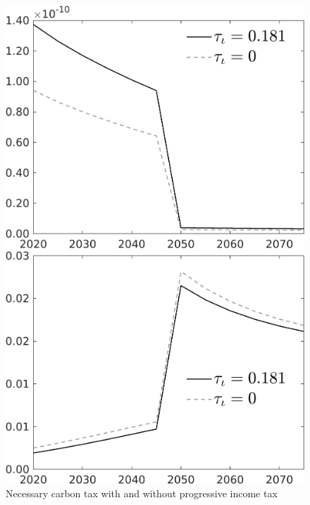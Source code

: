  \begin{figure}[h!!]
	\centering
	\caption{Necessary carbon tax with and without progressive income tax  }\label{fig:Limit_nsk0_xgr0_know_app}		
	\begin{minipage}[]{0.32\textwidth}
		\includegraphics[width=1\textwidth]{../../codding_model/own_basedOnFried/optimalPol_010922_revision/figures/all_13Sept22/CompTauf_bytaul_Reg0_sff_spillover0_nsk0_xgr0_knspil0_sep0_LFlimit1_emsbase0_countec0_GovRev0_etaa0.79_lgd1.png}
	\end{minipage}	
	\begin{minipage}[]{0.32\textwidth}
		\includegraphics[width=1\textwidth]{../../codding_model/own_basedOnFried/optimalPol_010922_revision/figures/all_13Sept22/CompTauf_bytaul_Reg0_sg_spillover0_nsk0_xgr0_knspil0_sep0_LFlimit1_emsbase0_countec0_GovRev0_etaa0.79_lgd1.png}

\end{minipage}
\end{figure}
